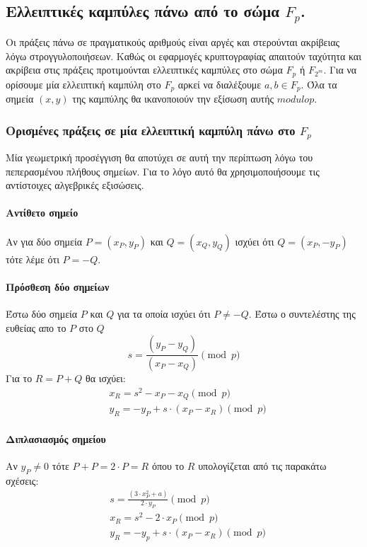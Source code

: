 \documentclass[12pt]{article}
\begin{document}
\subsection{Ελλειπτικές καμπύλες πάνω από το σώμα $F_p$.}
Οι πράξεις πάνω σε πραγματικούς αριθμούς είναι αργές και στερούνται ακρίβειας λόγω στρογγυλοποιήσεων. Καθώς οι εφαρμογές κρυπτογραφίας απαιτούν ταχύτητα και ακρίβεια στις πράξεις προτιμούνται ελλειπτικές καμπύλες στο σώμα $F_p$ ή $F_{2^m}$.
Για να ορίσουμε μία ελλειπτική καμπύλη στο $F_p$ αρκεί να διαλέξουμε $a,b \in F_p$. Όλα τα σημεία $(x,y)$ της καμπύλης θα ικανοποιούν την εξίσωση αυτής $modulo p$.

\subsubsection{Ορισμένες πράξεις σε μία ελλειπτική καμπύλη πάνω στο $F_p$}
Μία γεωμετρική προσέγγιση θα αποτύχει σε αυτή την περίπτωση λόγω του πεπερασμένου πλήθους σημείων. Για το λόγο αυτό θα χρησιμοποιήσουμε τις αντίστοιχες αλγεβρικές εξισώσεις.
\paragraph{Αντίθετο σημείο}
Αν για δύο σημεία $P = (x_P, y_P)$ και $Q = (x_Q, y_Q)$ ισχύει ότι $Q = (x_P, -y_P)$ τότε λέμε ότι $P = -Q$. 
\paragraph{Πρόσθεση δύο σημείων}
 Έστω δύο σημεία $P$ και $Q$ για τα οποία ισχύει ότι $P \neq -Q$.
 Έστω ο συντελέστης της ευθείας απο το $P$ στο $Q$ $$s = \frac{(y_P - y_Q)}{(x_P - x_Q)}  \pmod p$$
 Για το $R = P + Q$ θα ισχύει:
 \begin{align*}
 & x_R = s^2 - x_P - x_Q \pmod p \\
 & y_R = -y_P + s \cdot (x_P - x_R) \pmod p
 \end{align*}
 \paragraph{Διπλασιασμός σημείου}
  Αν $y_P \neq 0$ τότε $P + P = 2 \cdot P = R$ όπου το $R$ υπολογίζεται από τις παρακάτω σχέσεις:
  \begin{align*}
  & s = \frac{(3 \cdot x^2_P + a)}{2 \cdot y_P} \pmod p \\
  & x_R = s^2 - 2 \cdot x _P \pmod p \\
  & y_R = -y_p + s \cdot (x_P - x_R) \pmod p
  \end{align*}
\end{document}
